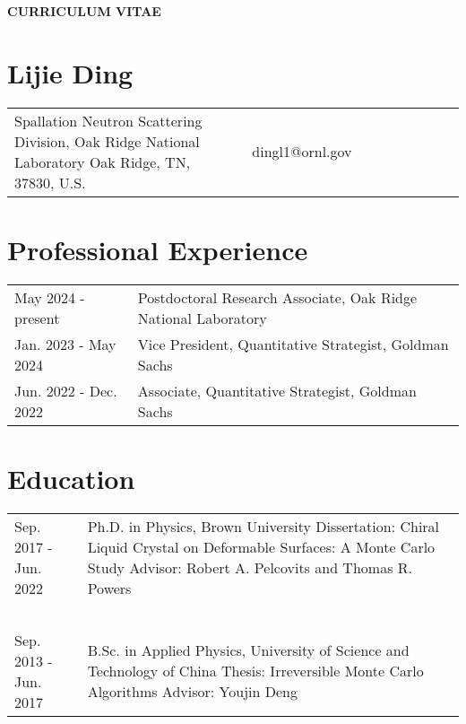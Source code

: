 \documentclass[11pt,letterpaper]{article}
\begin{document}
\pagestyle{headings}
\begin{center}
    \Large{\textbf{CURRICULUM VITAE}}
\end{center}
\section*{Lijie Ding}
\vspace*{-0.15in}
\begin{longtable}{p{0.5\linewidth} p{0.5\linewidth}}
    Spallation Neutron Scattering Division, \newline
    Oak Ridge National Laboratory \newline
    Oak Ridge, TN, 37830, U.S.
     & ~\newline
    dingl1@ornl.gov
\end{longtable}


\section*{Professional Experience}
\vspace*{-0.15in}
\begin{longtable}{l p{\linewidth}}
    May 2024 - present & Postdoctoral Research Associate, Oak Ridge National Laboratory \\
    Jan. 2023 - May 2024 & Vice President, Quantitative Strategist, Goldman Sachs \\
    Jun. 2022 - Dec. 2022 & Associate, Quantitative Strategist, Goldman Sachs \\
\end{longtable}


\section*{Education}
\vspace*{-0.15in}
\begin{longtable}{l p{\linewidth}}
    Sep. 2017 - Jun. 2022   & Ph.D. in Physics, Brown University \newline
    Dissertation: Chiral Liquid Crystal on Deformable Surfaces: A Monte Carlo Study \newline
    Advisor: Robert A. Pelcovits and Thomas R. Powers                                                 \\~\\
    Sep. 2013 - Jun. 2017   & B.Sc. in Applied Physics, University of Science and Technology of China \newline
    Thesis: Irreversible Monte Carlo Algorithms \newline
    Advisor: Youjin Deng
\end{longtable}
\end{document}
